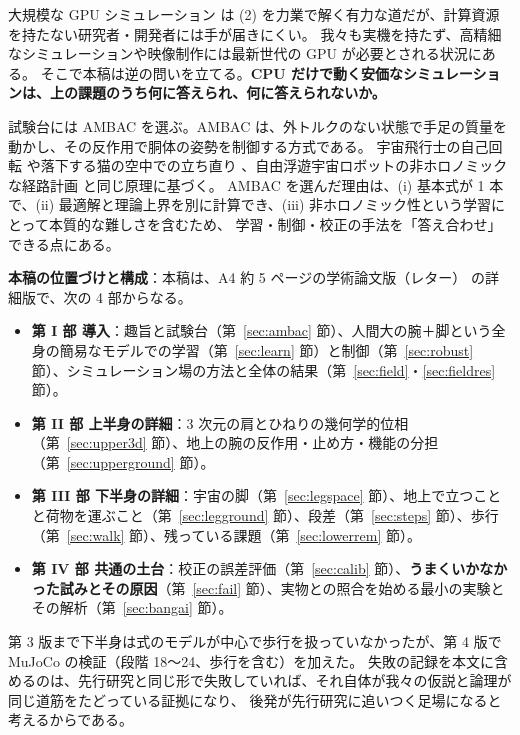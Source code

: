 \documentclass[paper=a4paper,fontsize=10pt,twocolumn,column_gap=2zw,line_length=24zw,number_of_lines=46,head_space=20mm]{jlreq}
\begin{document}
大規模な GPU シミュレーション \cite{makoviychuk2021} は (2) を力業で解く有力な道だが、計算資源を持たない研究者・開発者には手が届きにくい。
我々も実機を持たず、高精細なシミュレーションや映像制作には最新世代の GPU が必要とされる状況にある。
そこで本稿は逆の問いを立てる。\textbf{CPU だけで動く安価なシミュレーションは、上の課題のうち何に答えられ、何に答えられないか。}

試験台には AMBAC を選ぶ。AMBAC は、外トルクのない状態で手足の質量を動かし、その反作用で胴体の姿勢を制御する方式である。
宇宙飛行士の自己回転 \cite{kane1970} や落下する猫の空中での立ち直り \cite{kane1969,montgomery1993}、自由浮遊宇宙ロボットの非ホロノミックな経路計画 \cite{nakamura1991} と同じ原理に基づく。
AMBAC を選んだ理由は、(i) 基本式が 1 本で、(ii) 最適解と理論上界を別に計算でき、(iii) 非ホロノミック性という学習にとって本質的な難しさを含むため、
学習・制御・校正の手法を「答え合わせ」できる点にある。

\textbf{本稿の位置づけと構成}：本稿は、A4 約 5 ページの学術論文版（レター）\cite{letter2026} の詳細版で、次の 4 部からなる。
\begin{itemize}\setlength{\itemsep}{0pt}
\item \textbf{第 I 部 導入}：趣旨と試験台（第~\ref{sec:ambac} 節）、人間大の腕＋脚という全身の簡易なモデルでの学習（第~\ref{sec:learn} 節）と制御（第~\ref{sec:robust} 節）、シミュレーション場の方法と全体の結果（第~\ref{sec:field}・\ref{sec:fieldres} 節）。
\item \textbf{第 II 部 上半身の詳細}：3 次元の肩とひねりの幾何学的位相（第~\ref{sec:upper3d} 節）、地上の腕の反作用・止め方・機能の分担（第~\ref{sec:upperground} 節）。
\item \textbf{第 III 部 下半身の詳細}：宇宙の脚（第~\ref{sec:legspace} 節）、地上で立つことと荷物を運ぶこと（第~\ref{sec:legground} 節）、段差（第~\ref{sec:steps} 節）、歩行（第~\ref{sec:walk} 節）、残っている課題（第~\ref{sec:lowerrem} 節）。
\item \textbf{第 IV 部 共通の土台}：校正の誤差評価（第~\ref{sec:calib} 節）、\textbf{うまくいかなかった試みとその原因}（第~\ref{sec:fail} 節）、実物との照合を始める最小の実験とその解析（第~\ref{sec:bangai} 節）。
\end{itemize}
第 3 版まで下半身は式のモデルが中心で歩行を扱っていなかったが、第 4 版で MuJoCo の検証（段階 18〜24、歩行を含む）を加えた。
失敗の記録を本文に含めるのは、先行研究と同じ形で失敗していれば、それ自体が我々の仮説と論理が同じ道筋をたどっている証拠になり、
後発が先行研究に追いつく足場になると考えるからである。
\end{document}
